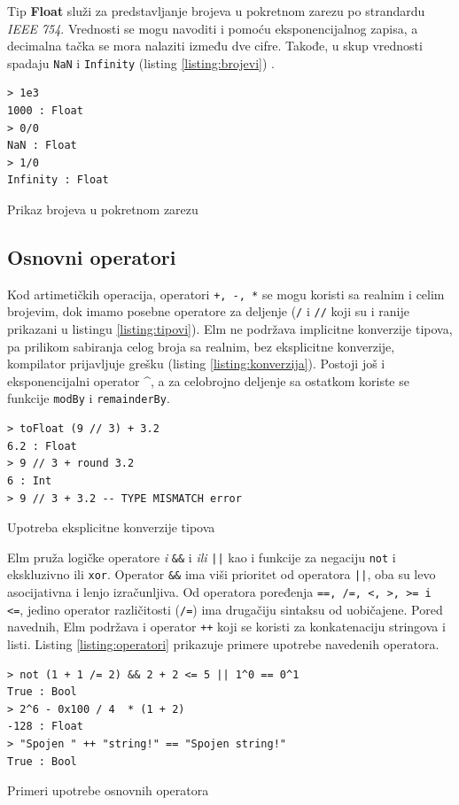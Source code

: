 \documentclass[12pt,oneside]{memoir}
\begin{document}
Tip \textbf{Float} služi za predstavljanje brojeva u pokretnom zarezu po strandardu
\emph{IEEE 754}. Vrednosti se mogu navoditi i pomoću eksponencijalnog zapisa, a decimalna 
tačka se mora nalaziti između dve cifre. Takođe, u skup vrednosti spadaju \texttt{NaN} i
\texttt{Infinity} (listing \ref{listing:brojevi}) .

\begin{listing}[ht]
\begin{verbatim}
> 1e3
1000 : Float
> 0/0 
NaN : Float
> 1/0 
Infinity : Float
\end{verbatim}
\caption{Prikaz brojeva u pokretnom zarezu}
\label{listing:brojevi}
\end{listing}


\subsection{Osnovni operatori}
Kod artimetičkih operacija, operatori \texttt{+, -, *} se mogu koristi sa realnim i 
celim brojevim, dok imamo posebne operatore za deljenje (\texttt{{/}} i \texttt{{//}} koji
su i ranije prikazani u listingu \ref{listing:tipovi}). Elm ne podržava implicitne konverzije
tipova, pa prilikom sabiranja celog broja sa realnim, bez eksplicitne konverzije, kompilator
prijavljuje grešku (listing \ref{listing:konverzija}). Postoji još i eksponencijalni operator \^{},
a za celobrojno deljenje sa ostatkom koriste se funkcije \texttt{modBy} i \texttt{remainderBy}.
\begin{listing}[h]
\begin{verbatim}
> toFloat (9 // 3) + 3.2
6.2 : Float
> 9 // 3 + round 3.2
6 : Int
> 9 // 3 + 3.2 -- TYPE MISMATCH error
\end{verbatim}
\caption{Upotreba eksplicitne konverzije tipova}
\label{listing:konverzija}
\end{listing}

Elm pruža logičke operatore \emph{i} \texttt{\&\&} i  \emph{ili} \texttt{||} kao i funkcije za negaciju 
\texttt{not} i ekskluzivno ili \texttt{xor}. Operator \texttt{\&\&} ima viši prioritet 
od operatora \texttt{||}, oba su levo asocijativna i lenjo izračunljiva. Od operatora poređenja 
\texttt{==, /=, <, >, >= i <=}, jedino operator različitosti (\texttt{/=}) ima drugačiju
sintaksu od uobičajene. Pored navednih, Elm podržava i operator \texttt{++} koji se koristi za
konkatenaciju stringova i listi. Listing \ref{listing:operatori} prikazuje primere upotrebe 
navedenih operatora.

\begin{listing}[h]
\begin{verbatim}
> not (1 + 1 /= 2) && 2 + 2 <= 5 || 1^0 == 0^1 
True : Bool
> 2^6 - 0x100 / 4  * (1 + 2)
-128 : Float
> "Spojen " ++ "string!" == "Spojen string!"
True : Bool
\end{verbatim}
\caption{Primeri upotrebe osnovnih operatora}
\label{listing:operatori}
\end{listing}
\end{document}
